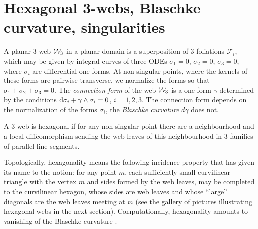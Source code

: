 \section{Hexagonal 3-webs, Blaschke curvature, singularities}
A planar 3-web ${\cal W}_3$ in a planar domain is a superposition of 3 foliations $\mathcal{F}_i$, which may be given by integral curves of three ODEs
$
\sigma _1=0$, $\sigma _2=0$, $ \sigma _3=0$,
where $\sigma _i$ are differential one-forms. At non-singular points, where the kernels of these forms are pairwise transverse, we normalize the forms so that
$\sigma_1+\sigma_2+\sigma_3=0.$ The {\it connection form} of the web ${\cal W}_3$ is a one-form $\gamma$ determined by the conditions
${\rm d}\sigma_i+\gamma \wedge \sigma_i=0$, $i=1,2,3$.
The connection form depends on the normalization of the forms $\sigma_i$, the {\it Blaschke curvature} $d\gamma$ does not.
\begin{Definition}
A 3-web is hexagonal if for any non-singular point there are a neighbourhood and a local diffeomorphism sending the web leaves of this neighbourhood in 3 families of parallel line segments.
\end{Definition}
Topologically, hexagonality means the following incidence property that has given its name to the notion: for any point $m$, each sufficiently small curvilinear triangle with the vertex $m$ and sides formed by the web leaves, may be completed to the curvilinear hexagon, whose sides are web leaves and whose ``large'' diagonals are the web leaves meeting at $m$ (see the gallery of pictures illustrating hexagonal webs in the next section). Computationally, hexagonality amounts to vanishing of the Blaschke curvature \cite{BB-38}.


